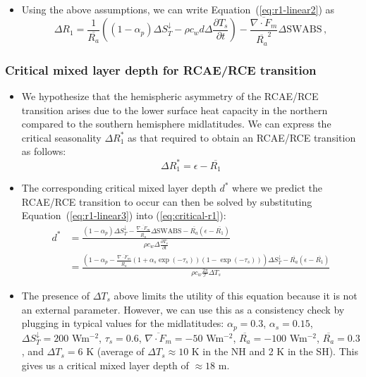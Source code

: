 \documentclass{ametsocV5}
\begin{document}
\begin{itemize}
\begin{enumerate}
        \end{enumerate}
  \item Using the above assumptions, we can write Equation~(\ref{eq:r1-linear2}) as
        \begin{equation} \label{eq:r1-linear3}
          \Delta R_{1} = \frac{1}{\overline{R_{a}}}\left((1-\alpha_{p})\Delta S_{T}^{\downarrow} -\rho c_{w} d \Delta\frac{\partial T_{s}}{\partial t} \right) - \frac{\overline{\nabla\cdot F_{m}}}{\overline{R_{a}}^{2}}\Delta \mathrm{SWABS} \, ,
        \end{equation}
\end{itemize}

        \subsubsection{Critical mixed layer depth for RCAE/RCE transition}
        \begin{itemize}
          \item We hypothesize that the hemispheric asymmetry of the RCAE/RCE transition arises due to the lower surface heat capacity in the northern compared to the southern hemisphere midlatitudes. We can express the critical seasonality $\Delta R_{1}^{*}$ as that required to obtain an RCAE/RCE transition as follows:
                \begin{equation} \label{eq:critical-r1}
                  \Delta R_{1}^{*} = \epsilon - \overline{R_{1}}
                \end{equation}
          \item The corresponding critical mixed layer depth $d^{*}$ where we predict the RCAE/RCE transition to occur can then be solved by substituting Equation~(\ref{eq:r1-linear3}) into (\ref{eq:critical-r1}):
                \begin{align} \label{eq:critical-d}
                  d^{*} &= \frac{(1-\alpha_{p})\Delta S_{T}^{\downarrow} - \frac{\overline{\nabla \cdot F_{m}}}{\overline{R_{a}}}\Delta \mathrm{SWABS} - \overline{R_{a}}(\epsilon-\overline{R_{1}}) }{\rho c_{w} \Delta \frac{\partial T_{s}}{\partial t}} \\
                        &= \frac{\left(1-\alpha_{p} -\frac{\overline{\nabla \cdot F_{m}}}{\overline{R_{a}}}(1+\alpha_{s}\exp(-\tau_{s}))(1-\exp(-\tau_{s}))\right)\Delta S_{T}^{\downarrow} - \overline{R_{a}}(\epsilon-\overline{R_{1}}) }{\rho c_{w} \frac{2\pi}{\mathcal{T}}\Delta T_{s}}
                \end{align}
          \item The presence of $\Delta T_{s}$ above limits the utility of this equation because it is not an external parameter. However, we can use this as a consistency check by plugging in typical values for the midlatitudes: $\alpha_{p} = 0.3$, $\alpha_{s} = 0.15$, $\Delta S_{T}^{\downarrow} = 200$ Wm$^{-2}$, $\tau_{s}=0.6$, $\overline{\nabla\cdot F_{m}}=-50$ Wm$^{-2}$, $\overline{R_{a}}=-100$ Wm$^{-2}$, $\overline{R_a} = 0.3$, and $\Delta T_{s}=6$ K (average of $\Delta T_{s}\approx 10$ K in the NH and 2 K in the SH). This gives us a critical mixed layer depth of $\approx 18$ m.
        \end{itemize}
\end{document}
